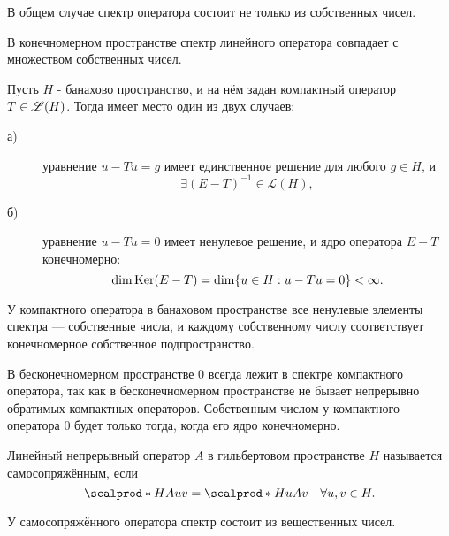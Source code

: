 \begin{note}
В общем случае спектр оператора состоит не только из собственных чисел.
\end{note}

\begin{note}
В конечномерном пространстве спектр линейного оператора совпадает с множеством собственных чисел.
\end{note}


\begin{theorem}[Фредгольм]
Пусть $H$ - банахово пространство, и на нём задан компактный оператор $T \in \mathscr{L}(H)$. Тогда имеет место один из двух случаев:
\begin{description}
\item [а)] уравнение $u - Tu = g$ имеет единственное решение для любого $g \in H$, и $$ \exists (E -T)^{-1} \in \mathscr{L}(H),$$
\item [б)] уравнение $u - Tu = 0$ имеет ненулевое решение, и ядро оператора $E-T$  конечномерно:
$$\dim \operatorname{Ker}(E-T) = \dim \{ u \in H : u - Tu = 0\} < \infty.$$
\end{description}
\end{theorem}

\begin{corollary}
У компактного оператора в банаховом пространстве все ненулевые элементы спектра --- собственные числа, и каждому собственному числу соответствует конечномерное собственное подпространство.
\end{corollary}

\begin{note}
В бесконечномерном пространстве $0$ всегда лежит в спектре компактного оператора, так как в бесконечномерном пространстве не бывает непрерывно обратимых компактных операторов. Собственным числом у компактного оператора $0$ будет только тогда, когда его ядро конечномерно.
\end{note}

\begin{definition}
Линейный непрерывный оператор $A$ в гильбертовом пространстве $H$ называется самосопряжённым, если
$$ \scalprod*{H}{Au}{v} = \scalprod*{H}{u}{Av} \quad \forall u,v \in H.$$
\end{definition}

\begin{note}
У самосопряжённого оператора спектр состоит из вещественных чисел.
\end{note}

